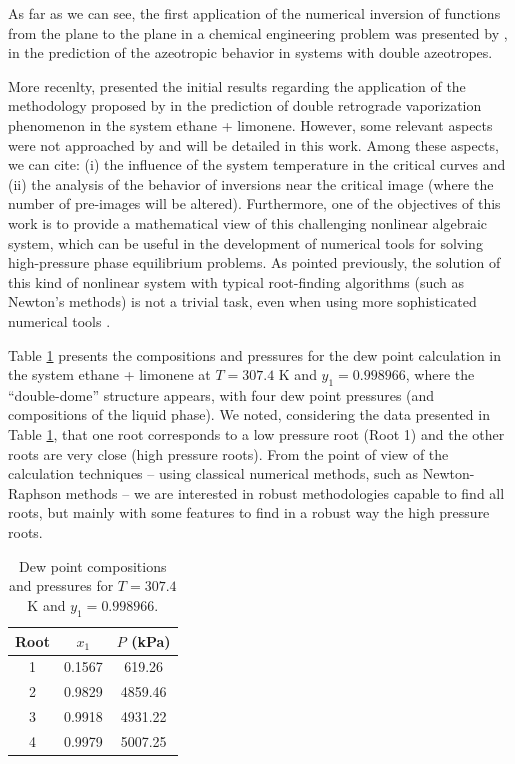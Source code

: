 \documentclass{article}
\theoremstyle{definition}
\theoremstyle{remark}
\begin{document}
As far as we can see, the first application of the numerical inversion of functions from the plane to the plane in a chemical engineering problem was presented by \cite{canadian}, in the prediction of the azeotropic behavior in systems with double azeotropes.

More recenlty, \cite{ireme} presented the initial results regarding the application of the methodology proposed by \cite{malta} in the prediction of double retrograde vaporization phenomenon in the system ethane + limonene. However, some relevant aspects were not approached by \cite{ireme} and will be detailed in this work. Among these aspects, we can cite: (i) the influence of the system temperature in the critical curves and (ii) the analysis of the behavior of inversions near the critical image (where the number of pre-images will be altered). Furthermore, one of the objectives of this work is to provide a mathematical view of this challenging nonlinear algebraic system, which can be useful in the development of numerical tools for solving high-pressure phase equilibrium problems. As pointed previously, the solution of this kind of nonlinear system with typical root-finding algorithms (such as Newton's methods) is not a trivial task, even when using more sophisticated numerical tools \cite{jnsa}.

Table \ref{tab:roots_double_dome} presents the compositions and pressures for the dew point calculation in the system ethane + limonene at $T = 307.4$ K and $y_1 = 0.998966$, where the ``double-dome'' structure appears, with four dew point pressures (and compositions of the liquid phase). We noted, considering the data presented in Table \ref{tab:roots_double_dome}, that one root corresponds to a low pressure root (Root 1) and the other roots are very close (high pressure roots). From the point of view of the calculation techniques -- using classical numerical methods, such as Newton-Raphson methods -- we are interested in robust methodologies capable to find all roots, but mainly with some features to find in a robust way the high pressure roots.

\begin{table}[http!]
	\begin{center}
	\begin{tabular}{ccc} \hline \small
Root & $x_1$ & $P$ (kPa) \\
\hline
1 & 0.1567 & 619.26 \\
2 & 0.9829 & 4859.46 \\
3 & 0.9918 & 4931.22 \\
4 & 0.9979 & 5007.25 \\
	\hline
	\end{tabular}
	\caption{ {\small Dew point compositions and pressures for $T = 307.4$ K and $y_1 = 0.998966$.}}\label{tab:roots_double_dome}
	\end{center}
\end{table}
\end{document}
